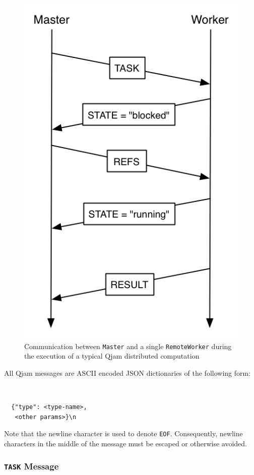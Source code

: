 \documentclass[%
  final,
  notitlepage,
  narroweqnarray,
  inline,
]{ieee}
\begin{document}
\begin{figure}[!h]
  \centering
  \includegraphics[scale=0.35]{protocol.png}
  \caption{Communication between \texttt{Master} and a single
           \texttt{RemoteWorker} during the execution of a typical Qjam
           distributed computation}
  \label{ProtocolDiagram}
\end{figure}


All Qjam messages are ASCII encoded JSON dictionaries of the following form:

{\tt \small
\begin{verbatim}
  {"type": <type-name>,
   <other params>}\n
\end{verbatim}}

Note that the newline character is used to denote \texttt{EOF}. Consequently,
newline characters in the middle of the message must be escaped or otherwise
avoided.

\subsubsection{\texttt{TASK} Message}
\end{document}
